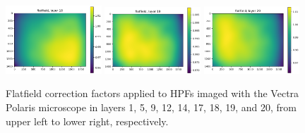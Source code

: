 \documentclass[letterpaper,11pt]{article}
\begin{document}
\begin{figure}[!ht]
\includegraphics[width=0.32\textwidth]{images/methods/flatfield_layers_polaris/flatfield_layer_18}
\includegraphics[width=0.32\textwidth]{images/methods/flatfield_layers_polaris/flatfield_layer_19}
\includegraphics[width=0.32\textwidth]{images/methods/flatfield_layers_polaris/flatfield_layer_20}
\caption{\footnotesize Flatfield correction factors applied to HPFs imaged with the Vectra Polaris microscope in layers 1, 5, 9, 12, 14, 17, 18, 19, and 20, from upper left to lower right, respectively.}
\label{fig:applied_flatfield_layers_polaris_1}
\end{figure}
\end{document}
